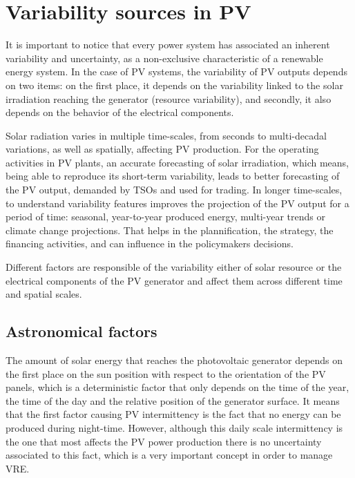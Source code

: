 \section{Variability sources in PV}

It is important to notice that every power system has associated an inherent variability and uncertainty, as a non-exclusive characteristic of a renewable energy system. In the case of PV systems, the variability of PV outputs depends on two items: on the first place, it depends on the variability linked to the solar irradiation reaching the generator (resource variability), and secondly, it also depends on the behavior of the electrical components.   

Solar radiation varies in multiple time-scales, from seconds to multi-decadal variations, as well as spatially, affecting PV production. For the operating activities in PV plants, an accurate forecasting of solar irradiation, which means, being able to reproduce its short-term variability, leads to better forecasting of the PV output, demanded by TSOs and used for trading. In longer time-scales, to understand variability features improves the projection of the PV output for a period of time: seasonal, year-to-year produced energy, multi-year trends or climate change projections. That helps in the plannification, the strategy, the financing activities, and can influence in the policymakers decisions.

Different factors are responsible of the variability either of solar resource or the electrical components of the PV generator and affect them across different time and spatial scales.

\subsection{Astronomical factors}

The amount of solar energy that reaches the photovoltaic generator depends on the first place on the sun position with respect to the orientation of the PV panels, which is a deterministic factor that only depends on the time of the year, the time of the day and the relative position of the generator surface. It means that the first factor causing PV intermittency is the fact that no energy can be produced during night-time. However, although this daily scale intermittency is the one that most affects the PV power production there is no uncertainty associated to this fact, which is a very important concept in order to manage VRE.


